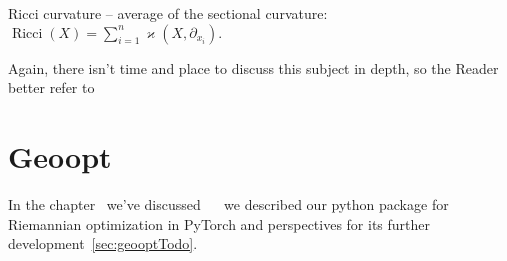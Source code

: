 Ricci curvature -- average of the sectional curvature:
\( \operatorname{Ricci}(X) = \sum_{i=1}^n \varkappa(X, \partial_{x_i}). \)

Again, there isn't time and place to discuss this subject in depth,
so the Reader better refer to~\citet{leeRiem}

\section{Geoopt}

In the chapter~ we've discussed
~~\cite{geoopt} we described our python package for
Riemannian optimization in PyTorch and perspectives for its further
development~\autoref{sec:geooptTodo}.
